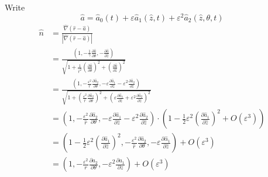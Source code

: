 \documentclass[12pt]{article}
\renewcommand{\(}{\left (}
\renewcommand{\)}{\right )}
\begin{document}
Write $$ \hat{a}=\hat{a}_{0}(t)+\varepsilon \hat{a}_{1}(\hat{z}, t)+\varepsilon^{2} \hat{a}_{2}\left(\hat{z}, \theta, t\right)$$
\begin{align}
	\hat{n} &=\frac{\hat{\nabla}(\hat{r}-\hat{a})}{|\hat{\nabla}(\hat{r}-\hat{a})|} \\
	& = \frac{\left(1,-\frac{1}{\gamma} \frac{\partial \hat{a}}{\partial \theta},-\frac{\partial \hat{a}}{\partial \hat{z}}\right)}{\sqrt{1+\frac{1}{\hat{r}^{2}}\left(\frac{\partial \hat{a}}{\partial \theta}\right)^{2}+\left(\frac{\partial \hat{a}}{\partial \hat{z}}\right)^{2}}} \\
	& = \frac{\left(1,-\frac{\varepsilon^{2}}{\hat{r}} \frac{\partial \hat{a}_{2}}{\partial \theta},-\varepsilon \frac{\partial \hat{a}_{1}}{\partial \hat{z}}-\varepsilon^{2} \frac{\partial \hat{a}_{2}}{\partial \hat{z}}\right)}
	{\sqrt{1+\left(\frac{\varepsilon^{2}}{\hat{r}} \frac{\partial \hat{a}_{2}}{\partial \theta}\right)^{2}+\left(\varepsilon \frac{\partial \hat{a}_{1}}{\partial \hat{z}}+\varepsilon^{2} \frac{\partial \hat{a}_{2}}{\partial \hat{z}}\right)^{2}}}\\
	&= \left(1,-\frac{\varepsilon^{2}}{\hat{r}} \frac{\partial \hat{a}_{2}}{\partial \theta},-\varepsilon \frac{\partial \hat{a}_{1}}{\partial \hat{z}}-\varepsilon^{2} \frac{\partial \hat{a}_{2}}{\partial \hat{z}}\right) \cdot \left(1-\frac{1}{2} \varepsilon^{2}\left(\frac{\partial \hat{a}_{1}}{\partial \hat{z}}\right)^{2}+O\left(\varepsilon^{3}\right)\right) \\
	&= \left(1-\frac{1}{2} \varepsilon^{2}\left(\frac{\partial \hat{a}_{1}}{\partial \hat{z}}\right)^{2},-\frac{\varepsilon^{2}}{\hat{r}} \frac{\partial \hat{a}_{2}}{\partial \theta},-\varepsilon \frac{\partial \hat{\alpha}_{1}}{\partial \hat{z}}\right) +O\left(\varepsilon^{3}\right) \\
	&= \left(1,-\frac{\varepsilon^{2}}{r} \frac{\partial a_{2}}{\partial \theta},-\varepsilon^{2} \frac{\partial a_{1}}{\partial z}\right) + O\left(\varepsilon^{3}\right)
\end{align}
\end{document}
